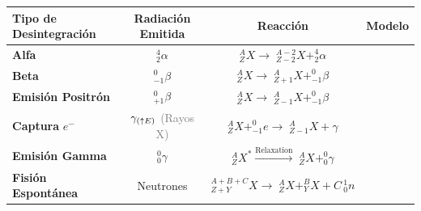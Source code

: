 \documentclass[varwidth=\maxdimen]{standalone}
\begin{document}
\begin{table}[H]
	\centering
	\def\arraystretch{3}
	\begin{tabular}{|l||c|c|c|}
		\hline
		Tipo de Desintegración & Radiación Emitida & Reacción & Modelo\\
		\hline \hline
		\textbf{Alfa} & $^4 _2 \alpha$ & $_Z ^A X\rightarrow\; _{Z-2} ^{A-2} X + _2 ^4 \alpha$ & \hspace{6cm} \\
		\hline
		\textbf{Beta} & $^0 _{-1} \beta$ & $_Z ^A X\rightarrow\; _{Z+1} ^{A} X + _{-1} ^0 \beta$ &  \\
		\hline
		\textbf{Emisión Positrón} &  $^0 _{+1} \beta$ & $_Z ^A X\rightarrow \;_{Z-1} ^{A} X + _{-1} ^0 \beta$ &  \\
		\hline
		\textbf{Captura} $e^-$ & $\gamma_{\tiny (\uparrow E)}$ {\textcolor{gray}{\scriptsize (Rayos X)}} & $_Z ^A X + ^0 _{-1} e \rightarrow\; _{Z-1} ^{A} X + \gamma$ &  \\
		\hline
		\textbf{Emisión Gamma} & $^0 _0 \gamma$ & $_Z ^A X^*\xrightarrow{\text{Relaxation}} \; _{Z} ^{A} X + _0 ^0 \gamma$ & \\ 
		\hline
		\textbf{Fisión Espontánea} & Neutrones & $_{Z+Y} ^{A+B+C} X\rightarrow\; _{Z} ^{A} X + _{Y} ^B X + C\, _0 ^1 n$ & \\
		\hline
	\end{tabular}
\end{table}
\end{document}
